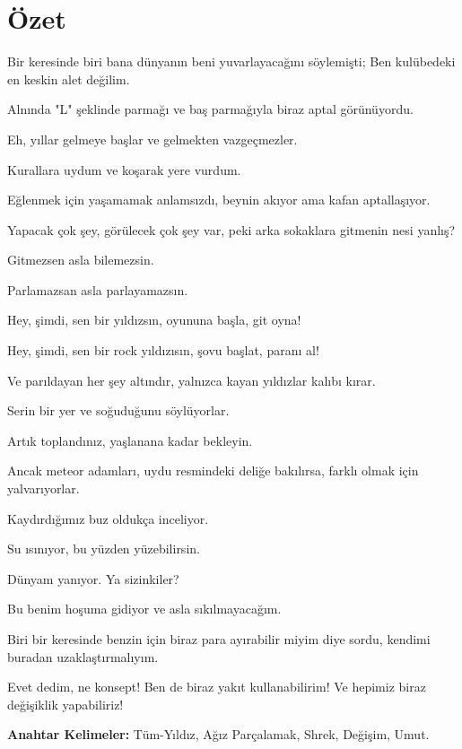 \chapter*{Özet}

Bir keresinde biri bana dünyanın beni yuvarlayacağını söylemişti; Ben kulübedeki en keskin alet değilim.

Alnında "L" şeklinde parmağı ve baş parmağıyla biraz aptal görünüyordu.

Eh, yıllar gelmeye başlar ve gelmekten vazgeçmezler.

Kurallara uydum ve koşarak yere vurdum.

Eğlenmek için yaşamamak anlamsızdı, beynin akıyor ama kafan aptallaşıyor.

Yapacak çok şey, görülecek çok şey var, peki arka sokaklara gitmenin nesi yanlış?

Gitmezsen asla bilemezsin.

Parlamazsan asla parlayamazsın.

Hey, şimdi, sen bir yıldızsın, oyununa başla, git oyna!

Hey, şimdi, sen bir rock yıldızısın, şovu başlat, paranı al!

Ve parıldayan her şey altındır, yalnızca kayan yıldızlar kalıbı kırar.

Serin bir yer ve soğuduğunu söylüyorlar.

Artık toplandınız, yaşlanana kadar bekleyin.

Ancak meteor adamları, uydu resmindeki deliğe bakılırsa, farklı olmak için yalvarıyorlar.

Kaydırdığımız buz oldukça inceliyor.

Su ısınıyor, bu yüzden yüzebilirsin.

Dünyam yanıyor. Ya sizinkiler?

Bu benim hoşuma gidiyor ve asla sıkılmayacağım.

Biri bir keresinde benzin için biraz para ayırabilir miyim diye sordu, kendimi buradan uzaklaştırmalıyım.

Evet dedim, ne konsept! Ben de biraz yakıt kullanabilirim! Ve hepimiz biraz değişiklik yapabiliriz!

\vfill
\textbf{Anahtar Kelimeler:} Tüm-Yıldız, Ağız Parçalamak, Shrek, Değişim, Umut.
\clearpage